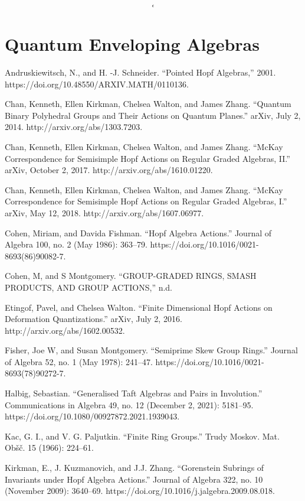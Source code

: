 \documentclass[12pt,a4paper]{article}
\newcommand\1{_{(1)}}
\newcommand\2{_{(2)}}
\begin{document}
\[
\lhook
\]

\section{Quantum Enveloping Algebras}



\begin{thebibliography}{99}
Andruskiewitsch, N., and H. -J. Schneider. “Pointed Hopf Algebras,” 2001. https://doi.org/10.48550/ARXIV.MATH/0110136.

Chan, Kenneth, Ellen Kirkman, Chelsea Walton, and James Zhang. “Quantum Binary Polyhedral Groups and Their Actions on Quantum Planes.” arXiv, July 2, 2014. http://arxiv.org/abs/1303.7203.

Chan, Kenneth, Ellen Kirkman, Chelsea Walton, and James Zhang. “McKay Correspondence for Semisimple Hopf Actions on Regular Graded Algebras, II.” arXiv, October 2, 2017. http://arxiv.org/abs/1610.01220.

Chan, Kenneth, Ellen Kirkman, Chelsea Walton, and James Zhang. “McKay Correspondence for Semisimple Hopf Actions on Regular Graded Algebras, I.” arXiv, May 12, 2018. http://arxiv.org/abs/1607.06977.

Cohen, Miriam, and Davida Fishman. “Hopf Algebra Actions.” Journal of Algebra 100, no. 2 (May 1986): 363–79. https://doi.org/10.1016/0021-8693(86)90082-7.

Cohen, M, and S Montgomery. “GROUP-GRADED RINGS, SMASH PRODUCTS, AND GROUP ACTIONS,” n.d.

Etingof, Pavel, and Chelsea Walton. “Finite Dimensional Hopf Actions on Deformation Quantizations.” arXiv, July 2, 2016. http://arxiv.org/abs/1602.00532.

Fisher, Joe W, and Susan Montgomery. “Semiprime Skew Group Rings.” Journal of Algebra 52, no. 1 (May 1978): 241–47. https://doi.org/10.1016/0021-8693(78)90272-7.

Halbig, Sebastian. “Generalised Taft Algebras and Pairs in Involution.” Communications in Algebra 49, no. 12 (December 2, 2021): 5181–95. https://doi.org/10.1080/00927872.2021.1939043.

Kac, G. I., and V. G. Paljutkin. “Finite Ring Groups.” Trudy Moskov. Mat. Ob\v s\v c. 15 (1966): 224–61.

Kirkman, E., J. Kuzmanovich, and J.J. Zhang. “Gorenstein Subrings of Invariants under Hopf Algebra Actions.” Journal of Algebra 322, no. 10 (November 2009): 3640–69. https://doi.org/10.1016/j.jalgebra.2009.08.018.


\end{thebibliography}
\end{document}
